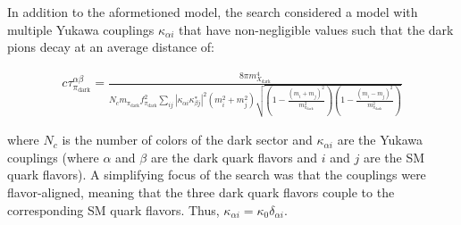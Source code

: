 In addition to the aformetioned model, the search considered a model with multiple Yukawa couplings $\kappa_{\alpha i}$ that have non-negligible values such that the dark pions decay at an average distance of:

\begin{equation}
	\begin{aligned}
		c\tau_{\pi_{\text{dark}}}^{\alpha\beta} = \frac{
		8\pi m_{X_{\text{dark}}}^4
		}{
		N_c m_{\pi_{\text{dark}}}f^2_{\pi_{\text{dark}}} \sum_{ij}|\kappa_{\alpha i}\kappa_{\beta j}^{*}|^2 (m_i^2 + m_j^2) \sqrt{\left(1 - \frac{(m_i + m_j)^2}{m_{\pi_{\text{dark}}}^2}\right)\left(1-\frac{(m_i - m_j)^2}{m_{\pi_{\text{dark}}}^2}\right)}
		}
	\end{aligned}
\end{equation}

where $N_c$ is the number of colors of the dark sector and $\kappa_{\alpha i}$ are the Yukawa couplings (where $\alpha$ and $\beta$ are the dark quark flavors and $i$ and $j$ are the SM quark flavors). A simplifying focus of the search was that the couplings were flavor-aligned, meaning that the three dark quark flavors couple to the corresponding SM quark flavors. Thus, $\kappa_{\alpha i} = \kappa_{0}\delta_{\alpha i}$.

